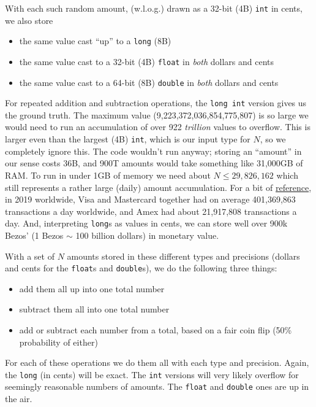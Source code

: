 \documentclass[11pt, oneside]{amsart}   	%
\begin{document}
With each such random amount, (w.l.o.g.) drawn as a 32-bit (4B) \texttt{int} in cents, we also store 
\begin{itemize}
\item the same value cast ``up'' to a \texttt{long} (8B)
\item the same value cast to a 32-bit (4B) \texttt{float} in {\em both} dollars and cents
\item the same value cast to a 64-bit (8B) \texttt{double} in {\em both} dollars and cents
\end{itemize}
For repeated addition and subtraction operations, the \texttt{long int} version gives us the ground truth. The maximum value (9,223,372,036,854,775,807) is so large we would need to run an accumulation of over 922 {\em trillion} values to overflow. This is larger even than the largest (4B) \texttt{int}, which is our input type for $N$, so we completely ignore this. The code wouldn't run anyway; storing an ``amount'' in our sense costs 36B, and 900T amounts would take something like 31,000GB of RAM. To run in under 1GB of memory we need about $N \leq 29,826,162$ which still represents a rather large (daily) amount accumulation. For a bit of \href{https://www.statista.com/statistics/261327/number-of-per-card-credit-card-transactions-worldwide-by-brand-as-of-2011/}{reference}, in 2019 worldwide, Visa and Mastercard together had on average 401,369,863 transactions a day worldwide, and Amex had about 21,917,808 transactions a day. And, interpreting \texttt{long}s as values in cents, we can store well over 900k Bezos' (1 Bezos $\sim$ 100 billion dollars) in monetary value. 

With a set of $N$ amounts stored in these different types and precisions (dollars and cents for the \texttt{float}s and \texttt{double}s), we do the following three things: 
\begin{itemize}
\item add them all up into one total number
\item subtract them all into one total number
\item add or subtract each number from a total, based on a fair coin flip (50\% probability of either)
\end{itemize}
For each of these operations we do them all with each type and precision. Again, the \texttt{long} (in cents) will be exact. The \texttt{int} versions will very likely overflow for seemingly reasonable numbers of amounts. The \texttt{float} and \texttt{double} ones are up in the air. 
\end{document}
